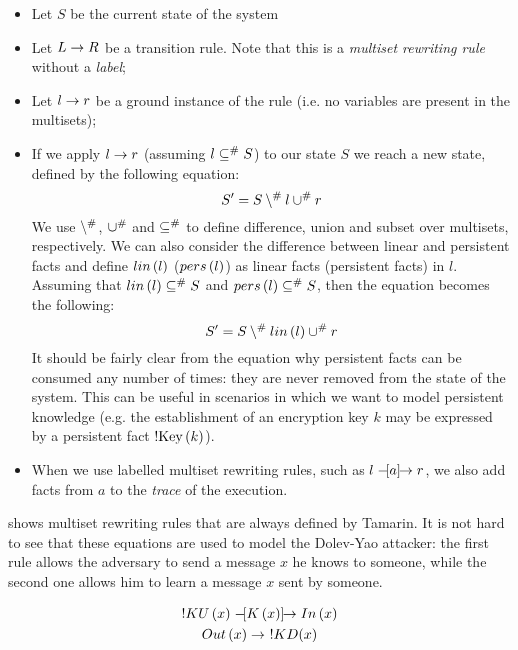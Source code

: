\begin{itemize}
    \item{Let $S$ be the current state of the system}
    \item{Let $L \rightarrow R$ be a transition rule. Note that this is a \textit{multiset rewriting rule} without a \textit{label};}
    \item{Let $l \rightarrow r$ be a ground instance of the rule (i.e. no variables are present in the multisets);}
    \item{If we apply $l \rightarrow r$ (assuming $l \subseteq^\# S$) to our state $S$ we reach a new state, defined by the following equation:
    \begin{equation}
        S' = S \setminus^\# l \cup^\# r
    \end{equation}
    We use $\setminus^\#$, $\cup^\#$ and $\subseteq^\#$ to define difference, union and subset over multisets, respectively. We can also consider the difference between linear and persistent facts and define $lin\left(l\right)$ ($pers\left(l\right)$) as linear facts (persistent facts) in $l$. Assuming that $lin\left(l\right) \subseteq^\# S$ and $pers\left(l\right) \subseteq^\# S$, then the equation becomes the following:
    \begin{equation}
        S' = S \setminus^\# lin\left(l\right) \cup^\# r
    \end{equation}
    It should be fairly clear from the equation why persistent facts can be consumed any number of times: they are never removed from the state of the system. This can be useful in scenarios in which we want to model persistent knowledge (e.g. the establishment of an encryption key $k$ may be expressed by a persistent fact $\mbox{!Key}\left(k\right)$).
    }
    \item{When we use labelled multiset rewriting rules, such as $l \mathrel{-\hspace{-2pt}[a]\hspace{-4pt}\to} r$, we also add facts from $a$ to the \textit{trace} of the execution.}
\end{itemize}

 shows multiset rewriting rules that are always defined by Tamarin. It is not hard to see that these equations are used to model the Dolev-Yao attacker: the first rule allows the adversary to send a message $x$ he knows to someone, while the second one allows him to learn a message $x$ sent by someone.

\begin{equation}
\label{eq:builtin-tamarin-msr-rules}
\begin{gathered}
    !KU\left(x\right) \mathrel{-\hspace{-2pt}[K\left(x\right)]\hspace{-4pt}\to} In\left(x\right)\\
    Out\left(x\right) \rightarrow \ !KD(x)
\end{gathered}
\end{equation}


